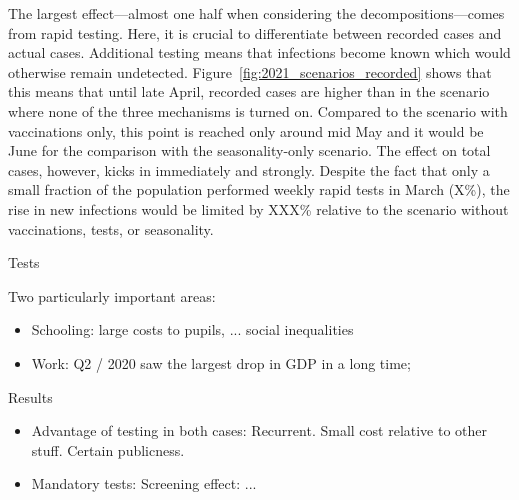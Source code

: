 The largest effect---almost one half when considering the decompositions---comes from
rapid testing. Here, it is crucial to differentiate between recorded cases and actual
cases. Additional testing means that infections become known which would otherwise
remain undetected. Figure~\ref{fig:2021_scenarios_recorded} shows that this means that
until late April, recorded cases are higher than in the scenario where none of the three
mechanisms is turned on. Compared to the scenario with vaccinations only, this point is
reached only around mid May and it would be June for the comparison with the
seasonality-only scenario. The effect on total cases, however, kicks in immediately and
strongly. Despite the fact that only a small fraction of the population performed weekly
rapid tests in March (X\%), the rise in new infections would be
limited by XXX\% relative to the scenario without vaccinations, tests, or seasonality.

Tests



\clearpage

Two particularly important areas:
\begin{itemize}
    \item Schooling: large costs to pupils, ... social inequalities
    \item Work: Q2 / 2020 saw the largest drop in GDP in a long time;
\end{itemize}

Results
\begin{itemize}
    \item Advantage of testing in both cases: Recurrent. Small cost relative to other
          stuff. Certain publicness.
    \item Mandatory tests: Screening effect: ...
\end{itemize}



